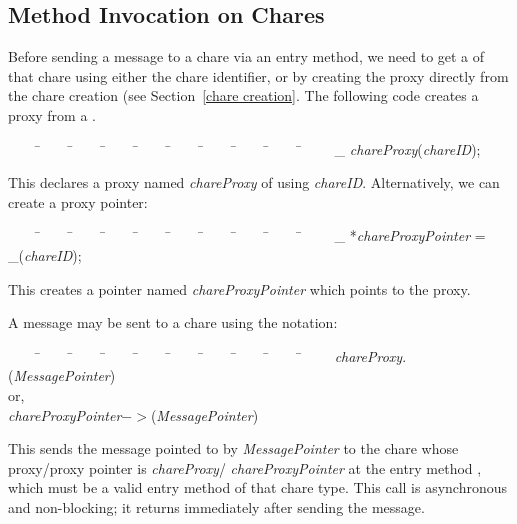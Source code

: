 \subsection{Method Invocation on Chares}

Before sending a message to a chare via an
entry method, we need to get a  of
that chare using either the chare identifier, or by creating the
proxy directly from the chare creation (see Section~\ref{chare
creation}. The following code creates a proxy from a .

\begin{tabbing} ~~~~ \=~~~~ \=~~~~ \=~~~~ \=~~~~ \=~~~~ \=~~~~ \=~~~~ \=~~~~
\=~~~~ \kill \> \_ {\it chareProxy}({\it chareID});
\end{tabbing}

This declares a proxy named {\it chareProxy} of  using {\it
chareID}.  Alternatively, we can create a proxy pointer:

\begin{tabbing} ~~~~ \=~~~~ \=~~~~ \=~~~~ \=~~~~ \=~~~~ \=~~~~ \=~~~~ \=~~~~
\=~~~~ \kill \> \_ *{\it chareProxyPointer} = \_({\it chareID}); \end{tabbing}

This creates a pointer named {\it chareProxyPointer} which points to the proxy. 

A message  may be sent to a chare using the
notation:

\begin{tabbing} ~~~~ \=~~~~ \=~~~~ \=~~~~ \=~~~~ \=~~~~ \=~~~~ \=~~~~ \=~~~~
\=~~~~ \kill \> {\it chareProxy}$.$({\it MessagePointer}) \\ \>
\> or, \\ \> {\it chareProxyPointer}$->$({\it MessagePointer})
\end{tabbing}

This sends the message pointed to by {\it MessagePointer} to the
chare whose proxy/proxy pointer is {\it chareProxy}/{\it
chareProxyPointer} at the entry method ,
which must be a valid entry method of that chare type. This call
is asynchronous and non-blocking; it returns immediately after sending the
message. 

